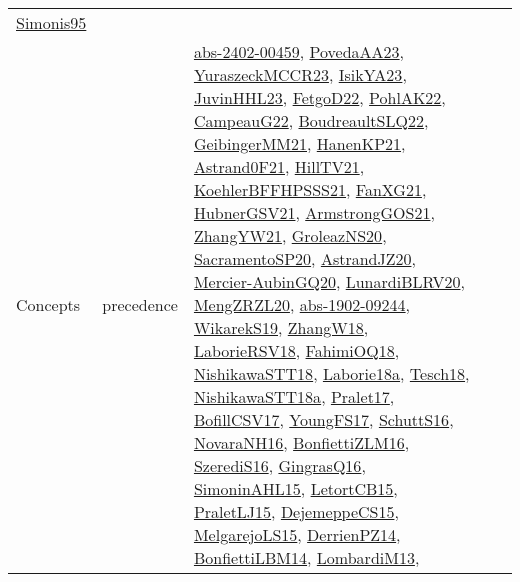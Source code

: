 {\begin{longtable}{lp{3cm}>{\raggedright}p{6cm}>{\raggedright}p{6cm}p{8cm}}
\href{papers/Simonis95.pdf}{Simonis95}\cite{Simonis95}\\
Concepts & precedence & \href{articles/abs-2402-00459.pdf}{abs-2402-00459}\cite{abs-2402-00459}, \href{papers/PovedaAA23.pdf}{PovedaAA23}\cite{PovedaAA23}, \href{articles/YuraszeckMCCR23.pdf}{YuraszeckMCCR23}\cite{YuraszeckMCCR23}, \href{articles/IsikYA23.pdf}{IsikYA23}\cite{IsikYA23}, \href{papers/JuvinHHL23.pdf}{JuvinHHL23}\cite{JuvinHHL23}, \href{articles/FetgoD22.pdf}{FetgoD22}\cite{FetgoD22}, \href{articles/PohlAK22.pdf}{PohlAK22}\cite{PohlAK22}, \href{articles/CampeauG22.pdf}{CampeauG22}\cite{CampeauG22}, \href{papers/BoudreaultSLQ22.pdf}{BoudreaultSLQ22}\cite{BoudreaultSLQ22}, \href{papers/GeibingerMM21.pdf}{GeibingerMM21}\cite{GeibingerMM21}, \href{papers/HanenKP21.pdf}{HanenKP21}\cite{HanenKP21}, \href{papers/Astrand0F21.pdf}{Astrand0F21}\cite{Astrand0F21}, \href{papers/HillTV21.pdf}{HillTV21}\cite{HillTV21}, \href{articles/KoehlerBFFHPSSS21.pdf}{KoehlerBFFHPSSS21}\cite{KoehlerBFFHPSSS21}, \href{articles/FanXG21.pdf}{FanXG21}\cite{FanXG21}, \href{articles/HubnerGSV21.pdf}{HubnerGSV21}\cite{HubnerGSV21}, \href{papers/ArmstrongGOS21.pdf}{ArmstrongGOS21}\cite{ArmstrongGOS21}, \href{articles/ZhangYW21.pdf}{ZhangYW21}\cite{ZhangYW21}, \href{papers/GroleazNS20.pdf}{GroleazNS20}\cite{GroleazNS20}, \href{articles/SacramentoSP20.pdf}{SacramentoSP20}\cite{SacramentoSP20}, \href{articles/AstrandJZ20.pdf}{AstrandJZ20}\cite{AstrandJZ20}, \href{papers/Mercier-AubinGQ20.pdf}{Mercier-AubinGQ20}\cite{Mercier-AubinGQ20}, \href{articles/LunardiBLRV20.pdf}{LunardiBLRV20}\cite{LunardiBLRV20}, \href{articles/MengZRZL20.pdf}{MengZRZL20}\cite{MengZRZL20}, \href{articles/abs-1902-09244.pdf}{abs-1902-09244}\cite{abs-1902-09244}, \href{articles/WikarekS19.pdf}{WikarekS19}\cite{WikarekS19}, \href{articles/ZhangW18.pdf}{ZhangW18}\cite{ZhangW18}, \href{articles/LaborieRSV18.pdf}{LaborieRSV18}\cite{LaborieRSV18}, \href{articles/FahimiOQ18.pdf}{FahimiOQ18}\cite{FahimiOQ18}, \href{papers/NishikawaSTT18.pdf}{NishikawaSTT18}\cite{NishikawaSTT18}, \href{papers/Laborie18a.pdf}{Laborie18a}\cite{Laborie18a}, \href{papers/Tesch18.pdf}{Tesch18}\cite{Tesch18}, \href{papers/NishikawaSTT18a.pdf}{NishikawaSTT18a}\cite{NishikawaSTT18a}, \href{papers/Pralet17.pdf}{Pralet17}\cite{Pralet17}, \href{papers/BofillCSV17.pdf}{BofillCSV17}\cite{BofillCSV17}, \href{papers/YoungFS17.pdf}{YoungFS17}\cite{YoungFS17}, \href{papers/SchuttS16.pdf}{SchuttS16}\cite{SchuttS16}, \href{articles/NovaraNH16.pdf}{NovaraNH16}\cite{NovaraNH16}, \href{papers/BonfiettiZLM16.pdf}{BonfiettiZLM16}\cite{BonfiettiZLM16}, \href{papers/SzerediS16.pdf}{SzerediS16}\cite{SzerediS16}, \href{papers/GingrasQ16.pdf}{GingrasQ16}\cite{GingrasQ16}, \href{articles/SimoninAHL15.pdf}{SimoninAHL15}\cite{SimoninAHL15}, \href{articles/LetortCB15.pdf}{LetortCB15}\cite{LetortCB15}, \href{papers/PraletLJ15.pdf}{PraletLJ15}\cite{PraletLJ15}, \href{papers/DejemeppeCS15.pdf}{DejemeppeCS15}\cite{DejemeppeCS15}, \href{papers/MelgarejoLS15.pdf}{MelgarejoLS15}\cite{MelgarejoLS15}, \href{papers/DerrienPZ14.pdf}{DerrienPZ14}\cite{DerrienPZ14}, \href{articles/BonfiettiLBM14.pdf}{BonfiettiLBM14}\cite{BonfiettiLBM14}, \href{papers/LombardiM13.pdf}{LombardiM13}\cite{LombardiM13}, 
\end{longtable}}
